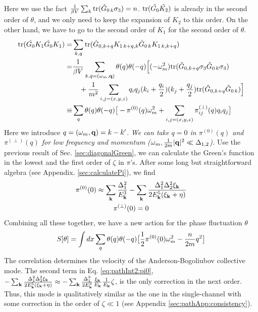 Here we use the fact $\frac{1}{{\beta{}V}}\sum_{k}\text{tr}(\hat{G}_{0\,k}\sigma_3)=n$. $\text{tr}(\hat{G_{0}}\hat{K_2})$ is already in the second order of $\theta$, and we only need to keep the expansion of $K_2$ to this order. On the other hand, we have to go to the second order of $K_1$ for the second order of $\theta$. 
\begin{align}		
\text{tr}(\hat{G_{0}}{K_1}\hat{G_{0}}{K_1})=&\sum_{k,q}\text{tr}(\hat{G}_{0,k+q}K_{1\,k+q,k}\hat{G}_{0\,k}K_{1\,k,k+q})\label{eq:pathInt2:GKGK}\\
=&\frac{1}{{\beta{}V}}\sum_{k,q=(\omega_m,\mathbf{q})}\theta(q)\theta(-q)\Big[(-\omega_m^2)\text{tr}(\hat{G}_{0,k+q}\sigma_3\hat{G}_{0\,k}\sigma_3)\nonumber\\
&\quad+\frac{1}{m^2}\sum_{i,j=(x,y,z)}q_iq_j(k_i+\frac{q_i}{2})(k_j+\frac{q_j}{2})\text{tr}(\hat{G}_{0,k+q}\hat{G}_{0\,k})\Big]\label{eq:pathInt2:GKGK2}\\
\equiv&\sum_{q}\theta(q)\theta(-q)\big[-\pi^{(0)}(q)\omega_m^2+\sum_{i,j=(x,y,z)}\pi^{(\perp)}_{ij}(q)q_iq_j\big]\label{eq:pathInt2:pi}
\end{align}
Here we introduce $q=(\omega_m,\mathbf{q})=k-k'$.  \emph{We can take $q=0$ in $\pi^{(0)}(q)$ and $\pi^{(\perp)}(q)$ for low frequency and momentum ($\omega_m,\frac{1}{2m} |\mathbf{q}|^2\ll\Delta_{1,2}$).  } Use the previous result of Sec. \ref{sec:diagonalGreen}, we can calculate the Green's function in the lowest and the first order of $\zeta$ in $\pi$'s.  After some long but straightforward algebra (see Appendix. \ref{sec:calculatePi}), we find
\begin{gather}
\pi^{(0)}(0)\approx\sum_{\mathbf{k}}\frac{\Delta_{1}^{2}}{E_{\mathbf{k}}^{3}}
	-\sum_{\mathbf{k}}\frac{\Delta_{1}^{2}\Delta_{2}^{2}\xi_{\mathbf{k}}}{2E_{\mathbf{k}}^{5}(\xi_{\mathbf{k}}+\eta)}
\label{eq:pathInt2:pi0}\\
\pi^{(\perp)}(0)=0
\end{gather}
Combining all these together, we have a new action for the phase fluctuation $\theta$
\begin{equation}
S[\theta]=\int{dx}\sum_{q}\theta(q)\theta(-q)\big[\frac{1}{2}\pi^{(0)}(0)\omega_m^2-\frac{n}{2m}q^2\big]
\end{equation}
The correlation determines the velocity of the Anderson-Bogoliubov collective mode.  The second term in Eq. \eqref{eq:pathInt2:pi0}, $-\sum_{\mathbf{k}}\frac{\Delta_{1}^{2}\Delta_{2}^{2}\xi_{\mathbf{k}}}{2E_{\mathbf{k}}^{5}(\xi_{\mathbf{k}}+\eta)}\approx-\sum_{\mathbf{k}}\frac{\Delta_{1}^{3}}{2E_{\mathbf{k}}^{3}}\frac{\xi_{\mathbf{k}}}{E_{\mathbf{k}}}\frac{1}{E_{\mathbf{k}}}\zeta$, is the only correction in the next order.  Thus, this mode   is qualitatively similar as  the one in the single-channel with some correction in the order of $\zeta\ll1$ (see Appendix \ref{sec:pathApp:consistency}).


